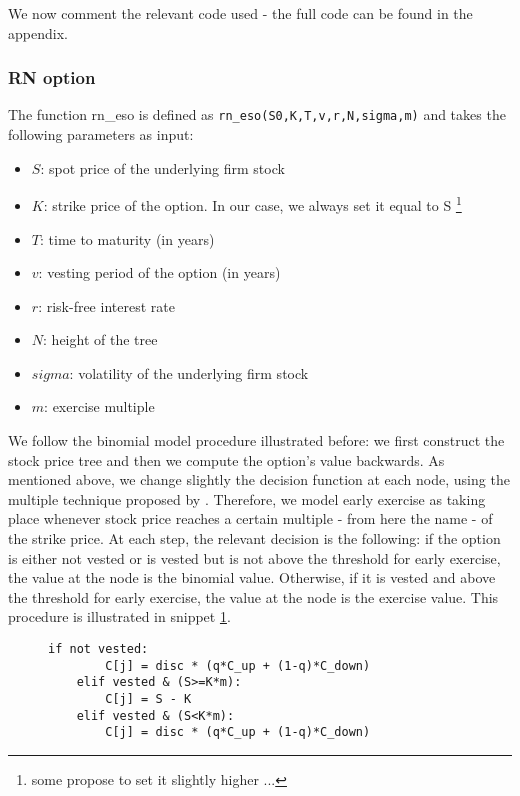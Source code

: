 We now comment the relevant code used - the full code can be found in the appendix.

\subsubsection{RN option}
The function rn\_eso is defined as \verb|rn_eso(S0,K,T,v,r,N,sigma,m)| and takes the following parameters as input:
\begin{itemize}
    \item $S$: spot price of the underlying firm stock
    \item $K$: strike price of the option. In our case, we always set it equal to S \footnote{some propose to set it slightly higher ...}
    \item $T$: time to maturity (in years)
    \item $v$: vesting period of the option (in years)
    \item $r$: risk-free interest rate
    \item $N$: height of the tree
    \item $sigma$: volatility of the underlying firm stock
    \item $m$: exercise multiple
\end{itemize}

    
We follow the binomial model procedure illustrated before: we first construct the stock price tree and then we compute the option's value backwards. As mentioned above, we change slightly the decision function at each node, using the multiple technique proposed by \cite{hull2002determining}. Therefore, we model early exercise as taking
place whenever stock price reaches a certain multiple - from here the name - of the strike price.
At each step, the relevant decision is the following: if the option is either not vested or is vested but is not above the threshold for early exercise, the value at the node is the binomial value. Otherwise, if it is vested and above the threshold for early exercise, the value at the node is the exercise value. This procedure is illustrated in snippet \ref*{fig:val_rn}.

\begin{figure}[H]
    \begin{lstlisting}[breaklines, basicstyle=\ttfamily\small]
    if not vested: 
        C[j] = disc * (q*C_up + (1-q)*C_down)
    elif vested & (S>=K*m):            
        C[j] = S - K
    elif vested & (S<K*m):
        C[j] = disc * (q*C_up + (1-q)*C_down)
    \end{lstlisting}
 \label{fig:val_rn}
\end{figure}

